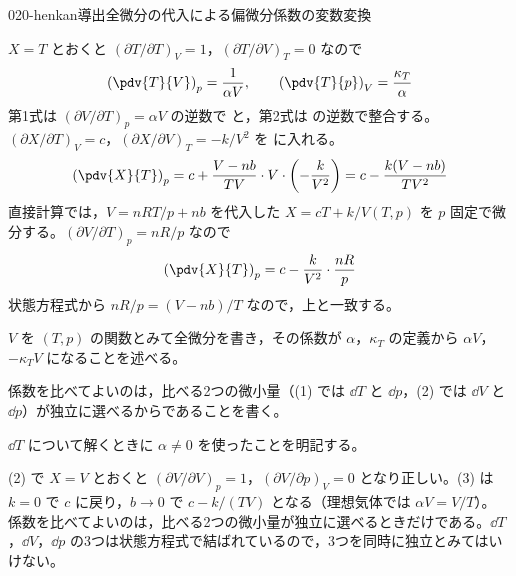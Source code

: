\documentclass[uplatex,dvipdfmx,a4paper,11pt]{jsarticle}
\begin{document}
\begin{mondai}{020-henkan}{導出}{全微分の代入による偏微分係数の変数変換}
\begin{tadashii}
$X = T$ とおくと $(\partial T/\partial T)_{V} = 1$，$(\partial T/\partial V)_{T} = 0$ なので
\[ \left(\pdv{T}{V}\right)_{p} = \frac{1}{\alpha V}, \qquad \left(\pdv{T}{p}\right)_{V} = \frac{\kappa_{T}}{\alpha} \]
第1式は $(\partial V/\partial T)_{p} = \alpha V$ の逆数で  と，第2式は  の逆数で整合する。
 $(\partial X/\partial T)_{V} = c$，$(\partial X/\partial V)_{T} = -k/V^{2}$ を  に入れる。
\[ \left(\pdv{X}{T}\right)_{p} = c + \frac{V - nb}{TV}\cdot V\cdot\left(-\frac{k}{V^{2}}\right) = c - \frac{k(V - nb)}{TV^{2}} \]
直接計算では，$V = nRT/p + nb$ を代入した $X = cT + k/V(T,p)$ を $p$ 固定で微分する。$(\partial V/\partial T)_{p} = nR/p$ なので
\[ \left(\pdv{X}{T}\right)_{p} = c - \frac{k}{V^{2}}\cdot\frac{nR}{p} \]
状態方程式から $nR/p = (V - nb)/T$ なので，上と一致する。
\begin{ronten}
  \item {} $V$ を $(T,p)$ の関数とみて全微分を書き，その係数が $\alpha$，$\kappa_{T}$ の定義から $\alpha V$，$-\kappa_{T}V$ になることを述べる。
  \item 係数を比べてよいのは，比べる2つの微小量（(1) では $\dd T$ と $\dd p$，(2) では $\dd V$ と $\dd p$）が独立に選べるからであることを書く。
  \item {} $\dd T$ について解くときに $\alpha \neq 0$ を使ったことを明記する。
\end{ronten}
\kenzan (2) で $X = V$ とおくと $(\partial V/\partial V)_{p} = 1$，$(\partial V/\partial p)_{V} = 0$ となり正しい。(3) は $k = 0$ で $c$ に戻り，$b \to 0$ で $c - k/(TV)$ となる（理想気体では $\alpha V = V/T$）。
\tsumazuki 係数を比べてよいのは，比べる2つの微小量が独立に選べるときだけである。$\dd T$，$\dd V$，$\dd p$ の3つは状態方程式で結ばれているので，3つを同時に独立とみてはいけない。
\end{tadashii}
\end{mondai}
\end{document}
